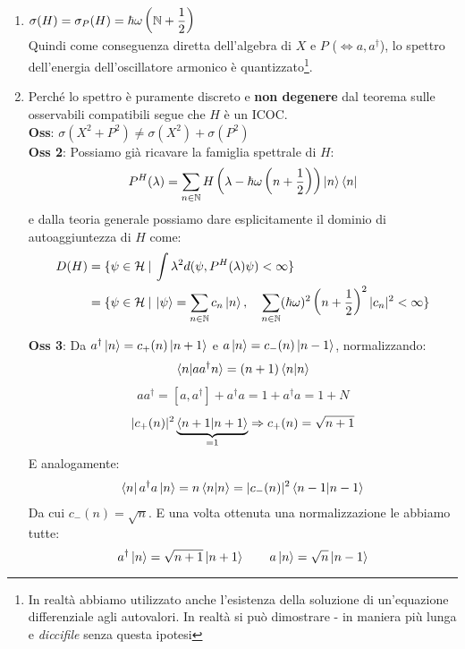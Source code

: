 \documentclass[../../FisicaTeorica.tex]{subfiles}
\begin{document}
\begin{enumerate}
\item $\displaystyle
\sigma(H)=\sigma_P(H)=\hbar \omega\left(\mathbb{N}+\frac{1}{2}\right)
$\\
Quindi come conseguenza diretta dell'algebra di $X$ e $P$ ($\Leftrightarrow a, a^\dag$), lo spettro dell'energia dell'oscillatore armonico è quantizzato\footnote{In realtà abbiamo utilizzato anche l'esistenza della soluzione di un'equazione differenziale agli autovalori. In realtà si può dimostrare - in maniera più lunga e \textit{diccifile} senza questa ipotesi}.
\item Perché lo spettro è puramente discreto e \textbf{non degenere} dal teorema sulle osservabili compatibili segue che $H$ è un ICOC.\\
\textbf{Oss}: $\sigma(X^2+ P^2) \neq \sigma(X^2) + \sigma(P^2)$\\
\textbf{Oss 2}: Possiamo già ricavare la famiglia spettrale di $H$:
\[
P^H(\lambda) = \sum_{n\in \mathbb{N}}H\left(\lambda-\hbar\omega\left(n+\frac{1}{2}\right) \right)\ket{n}\bra{n}
\] 
e dalla teoria generale possiamo dare esplicitamente il dominio di autoaggiuntezza di $H$ come:
\begin{align*}
D(H) &= \{\psi \in \mathcal{H} \>|\> \int \lambda^2 d(\psi, P^H(\lambda)\psi) < \infty\} \\
&=\{\psi \in \mathcal{H} \>|\> \ket{\psi}=\sum_{n\in \mathbb{N}}c_n\ket{n}, \quad \sum_{n\in \mathbb{N}} (\hbar \omega)^2 \left(n+\frac{1}{2}\right)^2 |c_n|^2 < \infty\}
\end{align*}

\textbf{Oss 3}: Da $a^\dag \ket{n} = c_+(n) \ket{n+1}$ e $a \ket{n} = c_-(n) \ket{n-1}$, normalizzando:
\[
\braket{n|aa^\dag n} = (n+1) \braket{n|n}
\]
\begin{align*}
a a^\dag = [a,a^\dag] + a^\dag a = 1+ a^\dag a = 1+ N
\end{align*}
\begin{align*}
|c_+(n)|^2 \underbrace{\braket{n+1|n+1}}_{=1} \Rightarrow  c_+(n) =\sqrt{n+1}
\end{align*}
E analogamente:
\begin{align*}
\bra{n}a^\dag a \ket{n} = n\braket{n|n} = |c_-(n)|^2 \braket{n-1|n-1}
\end{align*}
Da cui $c_-(n) = \sqrt{n}$. E una volta ottenuta una normalizzazione le abbiamo tutte:
\[
a^\dag \ket{n} = \sqrt{n+1}\ket{n+1}\qquad a\ket{n}=\sqrt{n}\ket{n-1}
\]


\end{enumerate}
\end{document}
